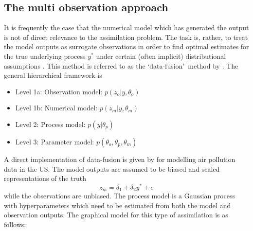 \documentclass[10pt,a4paper]{article}
\begin{document}
\subsection{The multi observation approach}\label{sec:mo}

It is frequently the case that the numerical model which has generated the output is not of direct relevance to the assimilation problem. The task is, rather, to treat the model outputs as surrogate observations in order to find optimal estimates for the true underlying process $y^*$ under certain (often implicit) distributional assumptions \citep{Berliner_2012}. This method is referred to as the \lq data-fusion\rq~method by \cite{Gelfand_2009}. The general hierarchical framework is
\begin{itemize}
\item Level 1a: Observation model: $p(z_o | y, \theta_o)$
\item Level 1b: Numerical model: $p(z_m | y, \theta_m)$
\item Level 2: Process model: $p(y | \theta_p)$
\item Level 3: Parameter model: $p(\theta_o, \theta_p, \theta_m)$
\end{itemize}

A direct implementation of data-fusion is given by \citep{Fuentes_2005} for modelling air pollution data in the US. The model outputs are assumed to be biased and scaled representations of the truth
\begin{equation}
z_m = \delta_1 + \delta_2y^* + e
\end{equation}
\noindent while the observations are unbiased. The process model is a Gaussian process with hyperparameters which need to be estimated from both the model and observation outputs. The graphical model for this type of assimilation is as follows:
\begin{figure}[h!]
\centering
{}
\end{figure}
\end{document}

